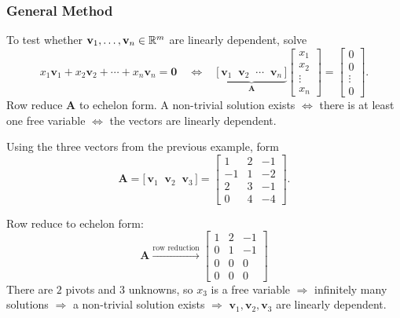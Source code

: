 \subsubsection{General Method}

To test whether $\mathbf{v}_1, \ldots, \mathbf{v}_n \in \mathbb{R}^m$ are linearly dependent, solve
\[
  x_1 \mathbf{v}_1 + x_2 \mathbf{v}_2 + \cdots + x_n \mathbf{v}_n = \mathbf{0}
  \quad \Longleftrightarrow \quad
  \underbrace{\bigl[\,\mathbf{v}_1 \;\; \mathbf{v}_2 \;\; \cdots \;\; \mathbf{v}_n\,\bigr]}_{\mathbf{A}}
  \begin{bmatrix}
    x_1 \\ x_2 \\ \vdots \\ x_n
  \end{bmatrix}
  =
  \begin{bmatrix}
    0 \\ 0 \\ \vdots \\ 0
  \end{bmatrix}
  .
\]
Row reduce $\mathbf{A}$ to echelon form. A non-trivial solution exists $\iff$ there is at least one free variable $\iff$ the vectors are linearly dependent.

\begin{example}
  Using the three vectors from the previous example, form
  \[
    \mathbf{A} = \bigl[\,\mathbf{v}_1 \;\; \mathbf{v}_2 \;\; \mathbf{v}_3\,\bigr]
    =
    \begin{bmatrix}
      1  & 2 & -1 \\
      -1 & 1 & -2 \\
      2  & 3 & -1 \\
      0  & 4 & -4
    \end{bmatrix}
    .
  \]

  Row reduce to echelon form:
  \[
    \mathbf{A}
    \xrightarrow{\text{row reduction}}
    \begin{bmatrix}
      1 & 2 & -1 \\
      0 & 1 & -1 \\
      0 & 0 & 0  \\
      0 & 0 & 0
    \end{bmatrix}
  \]
  There are $2$ pivots and $3$ unknowns, so $x_3$ is a free variable $\Longrightarrow$ infinitely many solutions $\Longrightarrow$ a non-trivial solution exists $\Longrightarrow$ $\mathbf{v}_1, \mathbf{v}_2, \mathbf{v}_3$ are linearly dependent.
\end{example}

